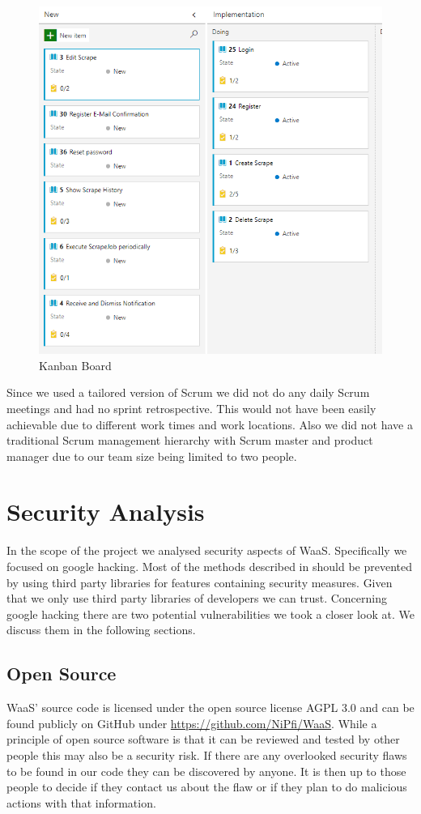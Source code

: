 \documentclass[titlepage, 12pt]{article}
\begin{document}
\begin{figure}[H]
  \centering
  \includegraphics[width=0.65\linewidth]{KanbanBoard.png}
  \caption{Kanban Board}
  \label{fig:kanbanBoard}
\end{figure}

Since we used a tailored version of Scrum we did not do any daily Scrum meetings and had no sprint retrospective. This would not have been easily achievable due to different work times and work locations. Also we did not have a traditional Scrum management hierarchy with Scrum master and product manager due to our team size being limited to two people.

\section{Security Analysis}

In the scope of the project we analysed security aspects of WaaS. Specifically we focused on google hacking. Most of the methods described in \cite{mJohnnyLong2005} should be prevented by using third party libraries for features containing security measures. Given that we only use third party libraries of developers we can trust. Concerning google hacking there are two potential vulnerabilities we took a closer look at. We discuss them in the following sections.

\subsection{Open Source}
\label{sec:opensource}

WaaS' source code is licensed under the open source license AGPL 3.0 and can be found publicly on GitHub under \url{https://github.com/NiPfi/WaaS}. While a principle of open source software is that it can be reviewed and tested by other people this may also be a security risk. If there are any overlooked security flaws to be found in our code they can be discovered by anyone. It is then up to those people to decide if they contact us about the flaw or if they plan to do malicious actions with that information.
\end{document}
